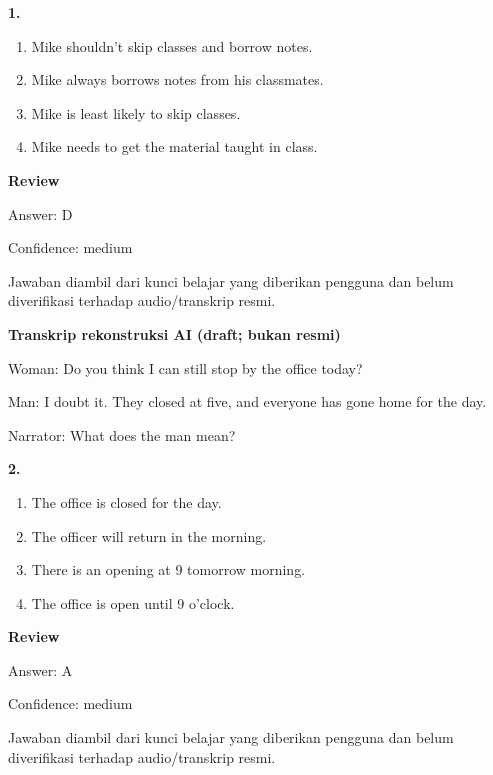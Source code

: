 \documentclass[12pt]{article}
\begin{document}
\noindent\textbf{1.}
\begin{enumerate}[label=(\Alph*),leftmargin=*,itemsep=0.2em]
\item Mike shouldn't skip classes and borrow notes.
\item Mike always borrows notes from his classmates.
\item Mike is least likely to skip classes.
\item Mike needs to get the material taught in class.
\end{enumerate}
\par
\begingroup
\setlength{\parskip}{0pt}
\setlength{\parindent}{0pt}
\textbf{Review}\par
Answer: D\par
Confidence: medium\par
Jawaban diambil dari kunci belajar yang diberikan pengguna dan belum diverifikasi terhadap audio/transkrip resmi.\par
\endgroup
\par
\vspace{0.25\baselineskip}
\begin{exampleblock}
\textbf{Transkrip rekonstruksi AI (draft; bukan resmi)}\par
Woman: Do you think I can still stop by the office today?\par
Man: I doubt it. They closed at five, and everyone has gone home for the day.\par
Narrator: What does the man mean?\par
\end{exampleblock}
\noindent\textbf{2.}
\begin{enumerate}[label=(\Alph*),leftmargin=*,itemsep=0.2em]
\item The office is closed for the day.
\item The officer will return in the morning.
\item There is an opening at 9 tomorrow morning.
\item The office is open until 9 o'clock.
\end{enumerate}
\par
\begingroup
\setlength{\parskip}{0pt}
\setlength{\parindent}{0pt}
\textbf{Review}\par
Answer: A\par
Confidence: medium\par
Jawaban diambil dari kunci belajar yang diberikan pengguna dan belum diverifikasi terhadap audio/transkrip resmi.\par
\endgroup
\end{document}
